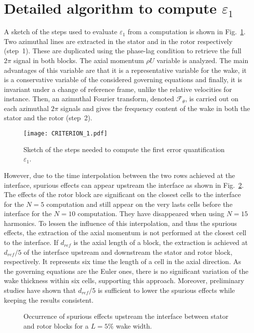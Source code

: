 
\section{Detailed algorithm to compute \texorpdfstring{$\varepsilon_1$}{e1}}
\label{app:epsilon_1_steps}

A sketch of the steps used to 
evaluate $\varepsilon_1$ from a computation is 
shown in Fig.~\ref{fig:CRITERION_1}.
Two azimuthal lines are extracted in the
stator and in the rotor respectively (step~\textcircled{\small{1}}). 
These are duplicated using the phase-lag
condition to retrieve the full $2 \pi$ signal in both 
blocks. The
axial momentum $\rho U$ variable is analyzed. The main advantages of
this variable are that it is a representative variable
for the wake, it is a conservative variable of the considered governing 
equations and finally, it is invariant under a change of reference frame, 
unlike the relative velocities for instance.
Then, an azimuthal Fourier transform,
denoted $\mathcal{F}_\theta$, is carried out on each azimuthal $2 \pi$ signals 
and gives the frequency content
of the wake in both the stator and the rotor (step~\textcircled{\small{2}}).
\begin{figure}[htp]
  \centering
  \texttt{[image: CRITERION\_1.pdf]}
  \caption{Sketch of the steps needed to 
  compute the first error quantification $\varepsilon_1$.}
  \label{fig:CRITERION_1}
\end{figure}
However, due to the time interpolation 
between the two rows achieved 
at the interface, spurious effects can 
appear upstream the interface as shown in Fig.~\ref{fig:rb_spurious_interf}. 
The effects of the rotor block are significant on the 
closest cells to the interface for the $N=5$ computation 
and still appear on the very lasts cells before the 
interface for the $N=10$ computation. 
They have disappeared when using $N=15$ harmonics.
To lessen the influence of this interpolation, and thus
the spurious effects,
the extraction of the axial momentum 
is not performed at the closest 
cell to the interface. If $d_{ref}$ is 
the axial length of a block, the extraction is achieved 
at $d_{ref} / 5$ of the interface upstream and downstream
the stator and rotor block, respectively. 
It represents six time the length of a cell 
in the axial direction.
As the governing equations are the Euler ones, 
there is no significant variation of the wake thickness 
within six cells, supporting this approach.
Moreover, preliminary studies have shown that $d_{ref} / 5$ is 
sufficient
to lower the spurious effects while keeping the
results consistent.
\begin{figure}[htp]
\centering
  \quad
  \quad
  \caption{Occurrence of spurious effects upstream 
  the interface between stator and rotor blocks for a $L=5\%$ wake width.}
  \label{fig:rb_spurious_interf}
\end{figure}

